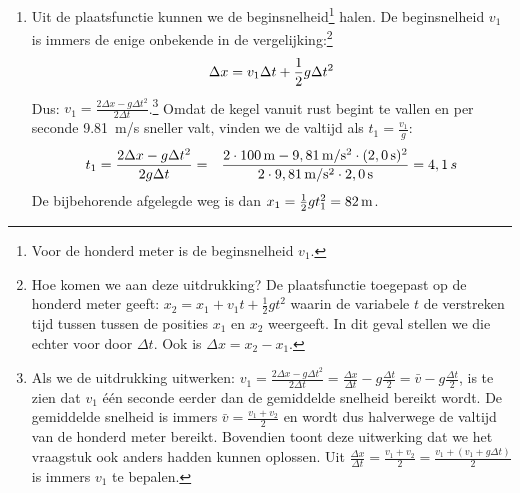\begin{oplossing}
\begin{enumerate}
\item Uit de plaatsfunctie kunnen we de beginsnelheid\footnote{Voor de honderd meter is de beginsnelheid $v_1$.} halen. De beginsnelheid $v_1$ is immers de enige onbekende in de vergelijking:\footnote{Hoe komen we aan deze uitdrukking? De plaatsfunctie toegepast op de honderd meter geeft: $x_2=x_1+v_1t+\frac{1}{2}gt^2$ waarin de variabele $t$ de verstreken tijd tussen tussen de posities $x_1$ en $x_2$ weergeeft. In dit geval stellen we die echter voor door $\Delta t$. Ook is $\Delta x=x_2-x_1$.}
\begin{equation*}
\Delta x=v_1\Delta t+\frac{1}{2}g\Delta t^2\\
\end{equation*}
Dus: $v_1=\frac{2\Delta x-g\Delta t^2}{2\Delta t}$.\footnote{Als we de uitdrukking uitwerken: $v_1=\frac{2\Delta x-g\Delta t^2}{2\Delta t}=\frac{\Delta x}{\Delta t}-g\frac{\Delta t}{2}=\bar{v}-g\frac{\Delta t}{2}$, is te zien dat $v_1$ \'e\'en seconde eerder dan de gemiddelde snelheid bereikt wordt. De gemiddelde snelheid is immers $\bar{v}=\frac{v_1+v_2}{2}$ en wordt dus halverwege de valtijd van de honderd meter bereikt. Bovendien toont deze uitwerking dat we het vraagstuk ook anders hadden kunnen oplossen. Uit $\frac{\Delta x}{\Delta t}=\frac{v_1+v_2}{2}=\frac{v_1+(v_1+g\Delta t)}{2}$ is immers $v_1$ te bepalen.}
Omdat de kegel vanuit rust begint te vallen en per seconde \SI{9,81}{m/s} sneller valt, vinden we de valtijd als $t_1=\frac{v_1}{g}$:
\begin{eqnarray*}
t_1=\frac{2\Delta x-g\Delta t^2}{2g\Delta t}&=&\frac{2\cdot100\rm\,m-9,81\rm\,m/s^2\cdot(2,0\rm\,s)^2}{2\cdot9,81\rm\,m/s^2\cdot2,0\rm\,s}=4,1\,s
\end{eqnarray*}
De bijbehorende afgelegde weg is dan $x_1=\frac{1}{2}gt_1^2=82\rm\,m$.
\end{enumerate}
\end{oplossing}